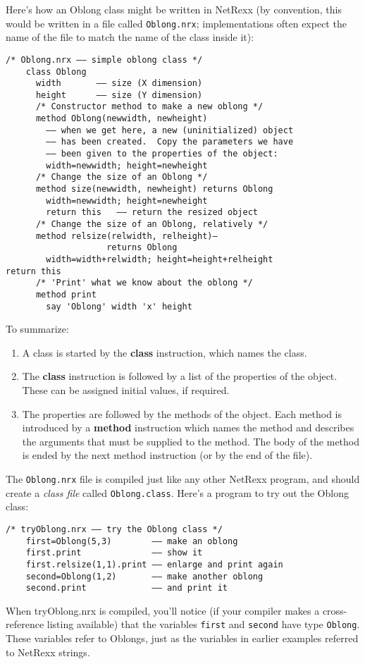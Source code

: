Here’s how an Oblong class might be written in NetRexx (by convention,
this would be written in a file called \texttt{Oblong.nrx}; implementations
often expect the name of the file to match the name of the class
inside it):
\begin{lstlisting}[label=oblong,caption=Oblong]
    /* Oblong.nrx –– simple oblong class */
    class Oblong
      width       –– size (X dimension)
      height      –– size (Y dimension)
      /* Constructor method to make a new oblong */
      method Oblong(newwidth, newheight)
        –– when we get here, a new (uninitialized) object
        –– has been created.  Copy the parameters we have
        –– been given to the properties of the object:
        width=newwidth; height=newheight
      /* Change the size of an Oblong */
      method size(newwidth, newheight) returns Oblong
        width=newwidth; height=newheight
        return this   –– return the resized object
      /* Change the size of an Oblong, relatively */
      method relsize(relwidth, relheight)–
                    returns Oblong
        width=width+relwidth; height=height+relheight
return this
      /* 'Print' what we know about the oblong */
      method print
        say 'Oblong' width 'x' height
\end{lstlisting}
To summarize:
\begin{enumerate}
\item A class is started by the \textbf{class} instruction, which names the class.
\item The \textbf{class} instruction is followed by a list of the properties of the object. These can be assigned initial values, if required.
\item The properties are followed by the methods of the object. Each
method is introduced by a \textbf{method} instruction which names the method
and describes the arguments that must be supplied to the method. The
body of the method is ended by the next method instruction (or by the
end of the file).
\end{enumerate}
The \texttt{Oblong.nrx} file is compiled just like any other NetRexx program,
and should create a \emph{class file} called \texttt{Oblong.class}. Here’s a program
to try out the Oblong class:
\begin{lstlisting}[label=tryoblong,caption=Try Oblong]
    /* tryOblong.nrx –– try the Oblong class */
    first=Oblong(5,3)        –– make an oblong
    first.print              –– show it
    first.relsize(1,1).print –– enlarge and print again
    second=Oblong(1,2)       –– make another oblong
    second.print             –– and print it
\end{lstlisting}
When tryOblong.nrx is compiled, you’ll notice (if your compiler makes a cross-reference listing available) that the variables \texttt{first} and \texttt{second} have type \texttt{Oblong}. These variables refer to Oblongs, just as the variables in earlier examples referred to NetRexx strings.

